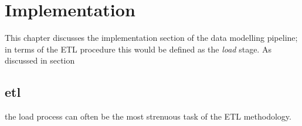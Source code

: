 \chapter{Implementation}\label{implementation}
This chapter discusses the implementation section of the data modelling pipeline; in terms of the ETL procedure this would be defined as the \textit{load} stage. As discussed in section \section{etl} the load process can often be the most strenuous task of the ETL methodology.